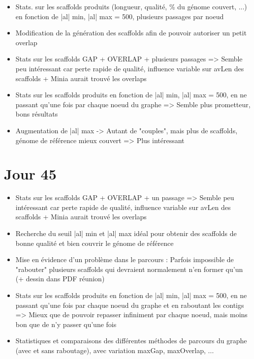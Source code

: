 \documentclass[12pt]{report}
\begin{document}
\begin{itemize}
	\item Stats. sur les scaffolds produits (longueur, qualité, \% du génome couvert, ...) en fonction de |al| min, |al| max = 500, plusieurs
	passages par noeud
	
	\item Modification de la génération des scaffolds afin de pouvoir autoriser un petit overlap
	
	\item Stats sur les scaffolds GAP + OVERLAP + plusieurs passages => Semble peu intéressant car perte rapide de qualité, influence variable
	sur avLen des scaffolds + Minia aurait trouvé les overlaps
	
	\item Stats sur les scaffolds produits en fonction de |al| min, |al| max = 500, en ne passant qu'une fois par chaque noeud du graphe 
	=> Semble plus prometteur, bons résultats
	
	\item Augmentation de |al| max -> Autant de "couples", mais plus de scaffolds, génome de référence mieux couvert => Plus intéressant
\end{itemize}

\section{Jour 45}

\begin{itemize}
	\item Stats sur les scaffolds GAP + OVERLAP + un passage => Semble peu intéressant car perte rapide de qualité, influence variable
	sur avLen des scaffolds + Minia aurait trouvé les overlaps

	\item Recherche du seuil |al| min et |al| max idéal pour obtenir des scaffolds de bonne qualité et bien couvrir le génome de référence
	
	\item Mise en évidence d'un problème dans le parcours : Parfois impossible de "rabouter" plusieurs scaffolds qui devraient normalement
	n'en former qu'un (+ dessin dans PDF réunion)
	
	\item Stats sur les scaffolds produits en fonction de |al| min, |al| max = 500, en ne passant qu'une fois par chaque noeud du graphe
	et en raboutant les contigs => Mieux que de pouvoir repasser infiniment par chaque noeud, mais moins bon que de n'y passer qu'une fois
	
	\item Statistiques et comparaisons des différentes méthodes de parcours du graphe (avec et sans raboutage), avec variation maxGap, 
	maxOverlap, ...
\end{itemize}
\end{document}
